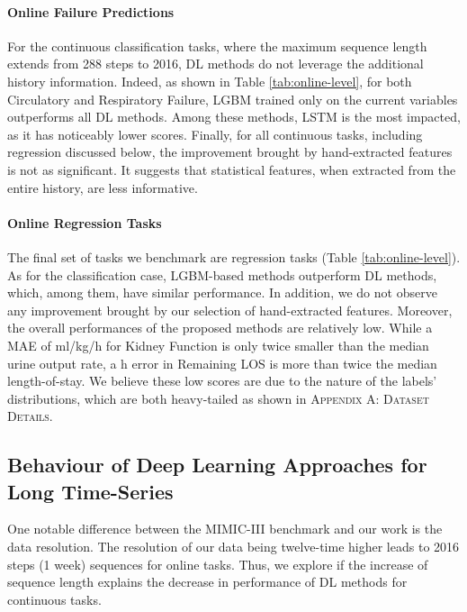 \documentclass{article}
\begin{document}
\paragraph{Online Failure Predictions} For the continuous classification tasks, where the maximum sequence length extends from 288 steps to 2016, DL methods do not leverage the additional history information. Indeed, as shown in Table \ref{tab:online-level}, for both Circulatory and Respiratory Failure, LGBM trained only on the current variables outperforms all DL methods. Among these methods, LSTM is the most impacted, as it has noticeably lower scores. Finally, for all continuous tasks, including regression discussed below, the improvement brought by hand-extracted features is not as significant. It suggests that statistical features, when extracted from the entire history, are less informative.


\paragraph{Online Regression Tasks} The final set of tasks we benchmark are regression tasks (Table \ref{tab:online-level}). As for the classification case, LGBM-based methods outperform DL methods, which, among them, have similar performance. In addition, we do not observe any improvement brought by our selection of hand-extracted features. Moreover, the overall performances of the proposed methods are relatively low. While a MAE of  ml/kg/h for Kidney Function is only twice smaller than the median urine output rate, a h error in Remaining LOS is more than twice the median length-of-stay. We believe these low scores are due to the nature of the labels' distributions, which are both heavy-tailed as shown in \textsc{Appendix A: Dataset Details}.

\subsection{Behaviour of Deep Learning Approaches for Long Time-Series}
One notable difference between the MIMIC-III benchmark \cite{harutyunyan2019multitask} and our work is the data resolution. The resolution of our data being twelve-time higher leads to 2016 steps (1 week) sequences for online tasks. Thus, we explore if the increase of sequence length explains the decrease in performance of DL methods for continuous tasks.
\end{document}
